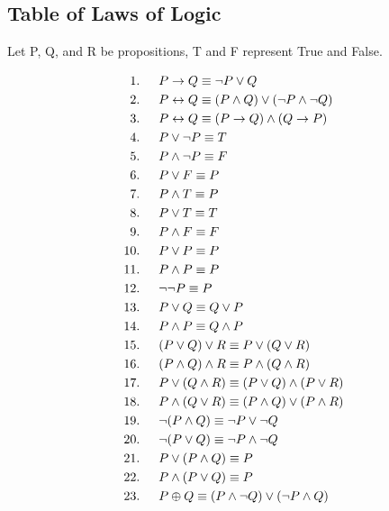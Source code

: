 \documentclass[12pt,letterpaper]{article} \usepackage{amsmath} \usepackage{graphicx}  \usepackage{longtable}  \usepackage{amssymb}
\begin{document}
        \subsection{Table of Laws of Logic}

        Let P, Q, and R be propositions, T and F represent True and False. 

        \begin{align*}
            1.& \indent P \to Q \equiv \lnot P \lor Q \\
            2.& \indent P \leftrightarrow Q \equiv (P \land Q) \lor (\lnot P \land \lnot Q) \\
            3.& \indent P \leftrightarrow Q \equiv (P\to Q) \land (Q\to P) \\
            4. &\indent P\lor \lnot P \equiv T\\
            5. &\indent P \land \lnot P \equiv F\\
            6. &\indent P \lor F \equiv P\\
            7. &\indent P \land T \equiv P \\
            8. &\indent P \lor T \equiv T \\
            9. &\indent P \land F \equiv F  \\
            10. &\indent P \lor P \equiv P \\
            11. &\indent P \land P \equiv P \\
            12. &\indent \lnot \lnot P \equiv P \\
            13. &\indent P \lor Q \equiv Q \lor P \\
            14. &\indent P \land P \equiv Q \land P \\
            15. &\indent (P \lor Q) \lor R \equiv P \lor (Q \lor R) \\
            16. &\indent (P \land Q) \land R \equiv P \land (Q \land R) \\
            17. &\indent P \lor (Q \land R) \equiv (P \lor Q) \land (P \lor R) \\
            18. &\indent P \land (Q \lor R) \equiv (P \land Q) \lor (P \land R) \\
            19. &\indent \lnot (P \land Q) \equiv \lnot P \lor \lnot Q \\
            20. &\indent \lnot (P \lor Q) \equiv \lnot P \land \lnot Q \\
            21. &\indent P \lor (P \land Q) \equiv P \\
            22. &\indent P \land (P \lor Q) \equiv P \\
            23. &\indent P \oplus Q \equiv (P \land \lnot Q) \lor (\lnot P \land Q) \\
        \end{align*}
\end{document}
